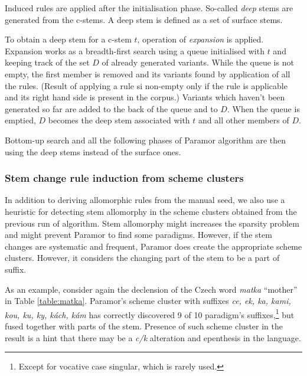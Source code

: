 \documentclass[11pt]{article}
\newcommand{\gloss}[2]{\emph{#1} ``#2''}
\newcommand{\e}[1]{\textit{#1}} %
\newcommand{\todojd}[1]{} %
\begin{document}
\noindent
Induced rules are applied after the initialisation phase. So-called \emph{deep} stems are generated from the c-stems. A deep stem is defined as a set of surface stems.

To obtain a deep stem for a c-stem $t$, operation of \emph{expansion} is applied. Expansion works as a breadth-first search using a queue initialised with $t$ and keeping track of the set $D$ of already generated variants. While the queue is not empty, the first member is removed and its variants found by application of all the rules. (Result of applying a rule si non-empty only if the rule is applicable and its right hand side is present in the corpus.) Variants which haven't been generated so far are added to the back of the queue and to $D$. When the queue is emptied, $D$ becomes the deep stem associated with $t$ and all other members of $D$. \todojd{Any reason why? Why not keep the deep stem ambiguous? This roughly means that rules are obligatory (If I can produce another allomorph, I have to). Some example, possibly mention where it helps and where it hurts. \textbf{RK:} No special reason for that. I may try an experiment where i keep the `surface' stems }

Bottom-up search and all the following phases of Paramor algorithm are then using the deep stems instead of the surface ones.

\subsubsection{Stem change rule induction from scheme clusters}
\label{sec:autoseed}

\noindent
In addition to deriving allomorphic rules from the manual seed, we also use a heuristic for detecting stem allomorphy in the scheme clusters obtained from the previous run of algorithm.
%
Stem allomorphy might increases the sparsity problem and might prevent Paramor to find some paradigms. However, if the stem changes are systematic and frequent, Paramor does create the appropriate scheme clusters. However, it considers the changing part of the stem to be a part of suffix.

As an example, consider again the declension of the Czech word \gloss{matka}{mother} in Table \ref{table:matka}. Paramor's scheme cluster with suffixes \emph{ce, ek, ka, kami, kou, ku, ky, kách, kám} has correctly discovered 9 of 10 paradigm's suffixes,\footnote{Except for vocative case singular, which is rarely used.} but fused together with parts of the stem.
Presence of such scheme cluster in the result is a hint that there may be a \e{c/k} alteration and epenthesis in the language.
\end{document}
